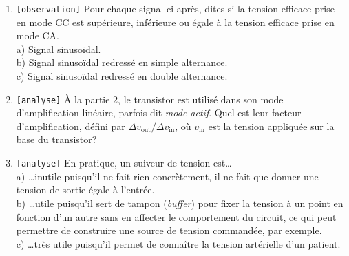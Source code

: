 \documentclass[canadien,12pt,oneside,letterpaper]{article}
\begin{document}
\begin{enumerate}
\item \texttt{[observation]} Pour chaque signal ci-après, dites si la tension efficace prise en mode CC est supérieure, inférieure ou égale à la tension efficace prise en mode CA.\\a) Signal sinusoïdal.\\b) Signal sinusoïdal redressé en simple alternance.\\c) Signal sinusoïdal redressé en double alternance.
\item \texttt{[analyse]} À la partie 2, le transistor est utilisé dans son mode d'amplification linéaire, parfois dit \textit{mode actif}. Quel est leur facteur d'amplification, défini par $\Delta v_{\mathrm{out}}/\Delta v_{\mathrm{in}}$, où $v_{\mathrm{in}}$ est la tension appliquée sur la base du transistor? %
\item \texttt{[analyse]} En pratique, un suiveur de tension est\dots\\a) \dots inutile puisqu'il ne fait rien concrètement, il ne fait que donner une tension de sortie égale à l'entrée.\\b) \dots utile puisqu'il sert de tampon (\textit{buffer}) pour fixer la tension à un point en fonction d'un autre sans en affecter le comportement du circuit, ce qui peut permettre de construire une source de tension commandée, par exemple.\\ c) \dots très utile puisqu'il permet de connaître la tension artérielle d'un patient.

\end{enumerate}
\end{document}
